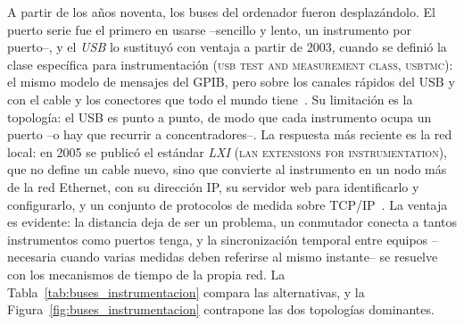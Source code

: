 A partir de los años noventa, los buses del ordenador fueron desplazándolo. El puerto serie fue el primero en usarse --sencillo y lento, un instrumento por puerto--, y el \emph{USB} lo sustituyó con ventaja a partir de 2003, cuando se definió la clase específica para instrumentación (\textsc{usb test and measurement class, usbtmc}): el mismo modelo de mensajes del GPIB, pero sobre los canales rápidos del USB y con el cable y los conectores que todo el mundo tiene~\cite{usbtmc_2003}. Su limitación es la topología: el USB es punto a punto, de modo que cada instrumento ocupa un puerto --o hay que recurrir a concentradores--. La respuesta más reciente es la red local: en 2005 se publicó el estándar \emph{LXI} (\textsc{lan extensions for instrumentation}), que no define un cable nuevo, sino que convierte al instrumento en un nodo más de la red Ethernet, con su dirección IP, su servidor web para identificarlo y configurarlo, y un conjunto de protocolos de medida sobre TCP/IP~\cite{lxi_2016}. La ventaja es evidente: la distancia deja de ser un problema, un conmutador conecta a tantos instrumentos como puertos tenga, y la sincronización temporal entre equipos --necesaria cuando varias medidas deben referirse al mismo instante-- se resuelve con los mecanismos de tiempo de la propia red. La Tabla~\ref{tab:buses_instrumentacion} compara las alternativas, y la Figura~\ref{fig:buses_instrumentacion} contrapone las dos topologías dominantes.

